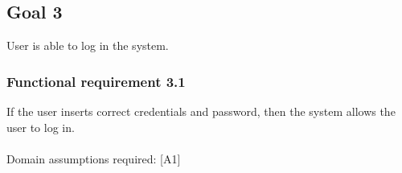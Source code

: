 \subsection{Goal 3}
User is able to log in the system.

\setcounter{secnumdepth}{3}
\subsubsection{Functional requirement 3.1}
If the user inserts correct credentials and password, then the system allows the user to log in.\\~\\
\noindent Domain assumptions required: [A1]
